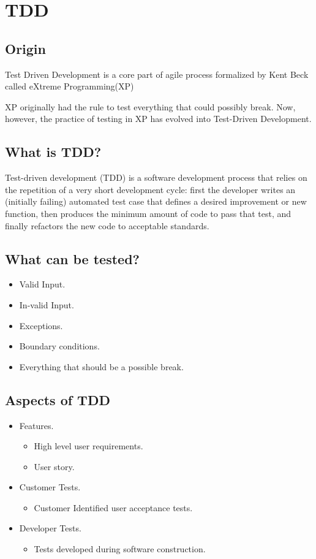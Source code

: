 \documentclass[11pt,a4paper]{article}
\author{TalentSprint}
\date{}
\begin{document}
\section*{TDD}
\subsection*{Origin}
Test Driven Development is a core part of agile process formalized by Kent Beck called eXtreme Programming(XP)

XP originally had the rule to test everything that could possibly break. Now, however, the practice of testing in XP has evolved into Test-Driven Development.

\subsection*{What is TDD?}

Test-driven development (TDD) is a software development process that relies on the repetition of a very short development cycle: first the developer writes an (initially failing) automated test case that defines a desired improvement or new function, then produces the minimum amount of code to pass that test, and finally refactors the new code to acceptable standards.

\subsection*{What can be tested?}
\begin{itemize}
\item Valid Input.
\item In-valid Input.
\item Exceptions.
\item Boundary conditions.
\item Everything that should be a possible break.
\end{itemize}

\subsection*{Aspects of TDD}
\begin{itemize}
\item Features.
\begin{itemize}
\item High level user requirements.
\item User story.
\end{itemize}
\item Customer Tests.
\begin{itemize}
\item Customer Identified user acceptance tests.
\end{itemize}
\item Developer Tests.
\begin{itemize}
\item Tests developed during software construction.
\end{itemize}
\end{itemize}
\end{document}
